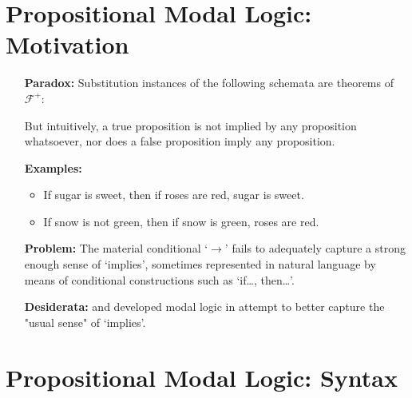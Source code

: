 \documentclass[a4paper, 11pt]{article} %
\begin{document}
\section*{\sc Propositional Modal Logic: Motivation}

\begin{enumerate}[leftmargin=1.2in,labelsep=.15in] 
\item[\bf Paradox:] Substitution instances of the following schemata are theorems of $\mathcal{F}^+$:
	\begin{itemize}\small
	\begin{multicols}{2}
	\item[(1)] $A\rightarrow(B\rightarrow A)$.
	\item[(2)] $\neg A\rightarrow(A\rightarrow B)$.
	\end{multicols}
	\end{itemize}
	But intuitively, a true proposition is not implied by any proposition whatsoever, nor does a false proposition imply any proposition.
\item[\bf Examples:] 
	\begin{itemize}
	\item If sugar is sweet, then if roses are red, sugar is sweet.
	\item If snow is not green, then if snow is green, roses are red.
	\end{itemize}
\item[\bf Problem:] The material conditional `$\rightarrow$' fails to adequately capture a strong enough sense of `implies', sometimes represented in natural language by means of conditional constructions such as `if\dots, then\dots'.%
\item[\bf Desiderata:] \citet{Lewis1912} and \citet{Lewis1932} developed modal logic in attempt to better capture the "usual sense" of `implies'.
\end{enumerate}





\section*{\sc Propositional Modal Logic: Syntax}
\end{document}
